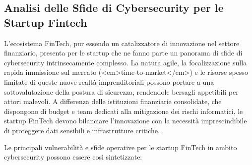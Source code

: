 \subsection{Analisi delle Sfide di Cybersecurity per le Startup Fintech}

L'ecosistema FinTech, pur essendo un catalizzatore di innovazione nel settore finanziario, presenta per le startup che ne fanno parte un panorama di sfide di cybersecurity intrinsecamente complesso. La natura agile, la focalizzazione sulla rapida immissione sul mercato (<em>time-to-market</em>) e le risorse spesso limitate di queste nuove realtà imprenditoriali possono portare a una sottovalutazione della postura di sicurezza, rendendole bersagli appetibili per attori malevoli. A differenza delle istituzioni finanziarie consolidate, che dispongono di budget e team dedicati alla mitigazione dei rischi informatici, le startup FinTech devono bilanciare l'innovazione con la necessità imprescindibile di proteggere dati sensibili e infrastrutture critiche.

Le principali vulnerabilità e sfide operative per le startup FinTech in ambito cybersecurity possono essere così sintetizzate:

